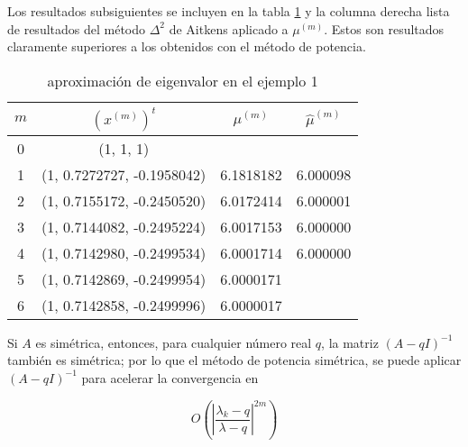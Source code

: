 \documentclass{report}
\numberwithin{subsection}{section} %
\begin{document}
Los resultados subsiguientes se incluyen en la tabla \ref{tab:ej222} y la columna derecha lista de resultados del método $\Delta^2$ de Aitkens aplicado a $\mu^{(m)}$. Estos son resultados claramente superiores a los obtenidos con el método de potencia.

\begin{table}[h!]
    \centering
    \caption{aproximación de eigenvalor en el ejemplo 1}
    \label{tab:ej222}
    \begin{tabular}{|cccc|} \hline
        $m$ & $(x^{(m)})^t$ & $\mu^{(m)}$ & $\hat{\mu}^{(m)}$ \\ \hline
        0  &  (1, 1, 1)  & & \\
        1  &  (1, 0.7272727, -0.1958042)  &  6.1818182 & 6.000098 \\
        2  &  (1, 0.7155172, -0.2450520)  &  6.0172414 & 6.000001 \\
        3  &  (1, 0.7144082, -0.2495224)  &  6.0017153 & 6.000000 \\
        4  &  (1, 0.7142980, -0.2499534)  &  6.0001714 & 6.000000 \\
        5  &  (1, 0.7142869, -0.2499954)  &  6.0000171 & \\
        6  &  (1, 0.7142858, -0.2499996)  &  6.0000017 & \\ \hline
    \end{tabular}
\end{table}

Si $A$ es simétrica, entonces, para cualquier número real $q$, la matriz $(A-q I)^{-1}$ también es simétrica; por lo que el método de potencia simétrica, se puede aplicar $(A-q I)^{-1}$ para acelerar la convergencia en

$$O\left( \left|\frac{\lambda_k - q}{\lambda - q}\right|^{2m} \right)$$   
\end{document}
